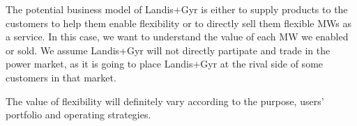 
The potential business model of Landis+Gyr is either to supply products to the customers to help them enable flexibility or to directly sell them flexible MWs as a service. In this case, we want to understand the value of each MW we enabled or sold. We assume Landis+Gyr will not directly partipate and trade in the power market, as it is going to place Landis+Gyr at the rival side of some customers in that market.

The value of flexibility will definitely vary according to the purpose, users' portfolio and operating strategies. 


